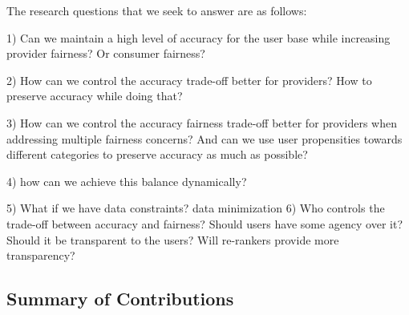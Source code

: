 
The research questions that we seek to answer are as follows:

1) Can we maintain a high level of accuracy for the user base while increasing provider fairness? Or consumer fairness?

2) How can we control the accuracy trade-off better for providers? How to preserve accuracy while doing that? 

3) How can we control the accuracy fairness trade-off better for providers when addressing multiple fairness concerns? And can we use user propensities towards different categories to preserve accuracy as much as possible?

4) how can we achieve this balance dynamically?

5) What if we have data constraints? data minimization
6) Who controls the trade-off between accuracy and fairness? Should users have some agency over it? Should it be transparent to the users? Will re-rankers provide more transparency?




\subsection{Summary of Contributions}

